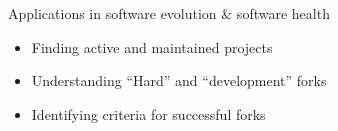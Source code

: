 \documentclass[aspectratio=169,xcolor=table]{beamer}
\begin{document}
\begin{frame}
        \begin{block}{Applications in software evolution \& software health}
            \begin{itemize}
                \item Finding active and maintained projects
                \item Understanding ``Hard'' and ``development'' forks
                \item Identifying criteria for successful forks
            \end{itemize}
        \end{block}
    \end{frame}

\end{document}
